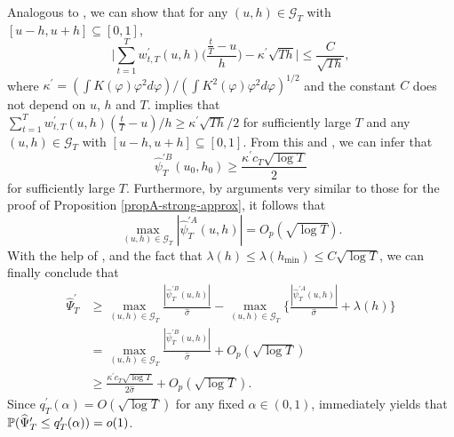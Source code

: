 \documentclass[a4paper,12pt]{article}
\makeatletter
\renewcommand{\eqref}[1]{\tagform@{\ref{#1}}}
\makeatother
\begin{document}
Analogous to \eqref{eq2-proof-prop-test-power}, we can show that for any $(u,h) \in \mathcal{G}_T$ with $[u-h,u+h] \subseteq [0,1]$, 
\begin{equation}\label{eq3-proof-prop-test-shape-power}
\Big| \sum\limits_{t=1}^T w_{t,T}^\prime(u,h) \Big(\frac{\frac{t}{T} - u}{h}\Big) - \kappa^\prime \sqrt{Th} \Big| \le \frac{C}{\sqrt{Th}}, 
\end{equation}
where $\kappa^\prime = (\int K(\varphi) \varphi^2 d\varphi) / (\int K^2(\varphi) \varphi^2 d\varphi)^{1/2}$ and the constant $C$ does not depend on $u$, $h$ and $T$. \eqref{eq3-proof-prop-test-shape-power} implies that $\sum\nolimits_{t=1}^T w_{t,T}^\prime(u,h) (\frac{t}{T} - u)/h \ge \kappa^\prime \sqrt{Th} / 2$ for sufficiently large $T$ and any $(u,h) \in \mathcal{G}_T$ with $[u-h,u+h] \subseteq [0,1]$. From this and \eqref{eq2-proof-prop-test-shape-power}, we can infer that 
\begin{equation}\label{eq4-proof-prop-test-shape-power}
\widehat{\psi}_T^{\prime B}(u_0,h_0) \ge \frac{\kappa^\prime c_T \sqrt{\log T}}{2} 
\end{equation}
for sufficiently large $T$. Furthermore, by arguments very similar to those for the proof of Proposition \ref{propA-strong-approx}, it follows that
\begin{equation}\label{eq5-proof-prop-test-shape-power}
\max_{(u,h) \in \mathcal{G}_T} |\widehat{\psi}_T^{\prime A}(u,h)| = O_p(\sqrt{\log T}). 
\end{equation}
With the help of \eqref{eq4-proof-prop-test-shape-power}, \eqref{eq5-proof-prop-test-shape-power} and the fact that $\lambda(h) \le \lambda(h_{\min}) \le C \sqrt{\log T}$, we can finally conclude that
\begin{align}
\widehat{\Psi}_T^\prime 
 & \ge \max_{(u,h) \in \mathcal{G}_T} \frac{|\widehat{\psi}_T^{\prime B}(u,h)|}{\widehat{\sigma}} - \max_{(u,h) \in \mathcal{G}_T} \Big\{ \frac{|\widehat{\psi}_T^{\prime A}(u,h)|}{\widehat{\sigma}} + \lambda(h) \Big\} \nonumber \\
 & = \max_{(u,h) \in \mathcal{G}_T} \frac{|\widehat{\psi}_T^{\prime B}(u,h)|}{\widehat{\sigma}} + O_p(\sqrt{\log T}) \nonumber \\
 & \ge \frac{\kappa^\prime c_T \sqrt{\log T}}{2 \widehat{\sigma}} + O_p(\sqrt{\log T}). \label{eq6-proof-prop-test-shape-power}
\end{align}  
Since $q_T^\prime(\alpha) = O(\sqrt{\log T})$ for any fixed $\alpha \in (0,1)$, \eqref{eq6-proof-prop-test-shape-power} immediately yields that $\mathbb{P}(\widehat{\Psi}_T^\prime \le q_T^\prime(\alpha)) = o(1)$. 
\end{document}
